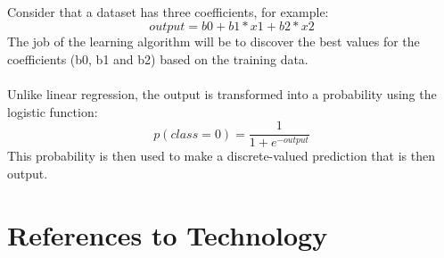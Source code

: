\paragraph{}
Consider that a dataset has three coefficients, for example:
\begin{equation}
output = b0 + b1*x1 + b2*x2
\end{equation}
The job of the learning algorithm will be to discover the best values for the coefficients (b0, b1 and b2) based on the training data.
\paragraph{}
Unlike linear regression, the output is transformed into a probability using the logistic function:
\begin{equation}
p(class=0) = \frac{1}{1 + e^{-output}}
\end{equation}
This probability is then used to make a discrete-valued prediction that is then output.


\section{References to Technology}

\begin{comment}
\paragraph{Machine Learning}
Machine learning is a subfield of computer science that evolved from the study of pattern recognition and computational learning theory in artificial intelligence.In 1959, Arthur Samuel defined machine learning as a 
\begin{quote}
"Field of study that gives computers the ability to learn without being explicitly programmed".
\end{quote} Machine learning explores the study and construction of algorithms that can learn from and make predictions on data. Such algorithms operate by building a model from example inputs in order to make data-driven predictions or decisions, rather than following strictly static program instructions.
\end{comment}

